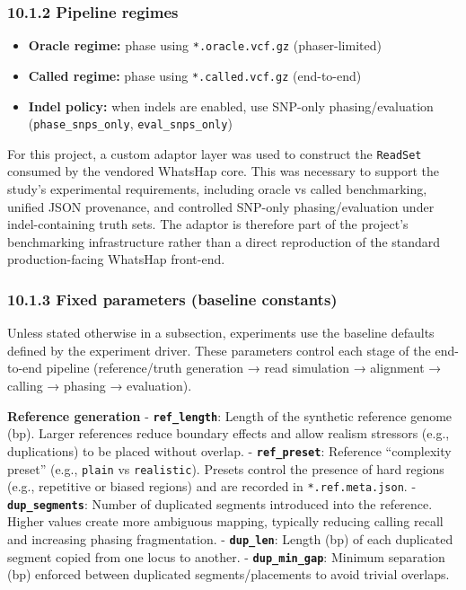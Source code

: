 \documentclass[
]{article}
\providecommand{\tightlist}{%
  \setlength{\itemsep}{0pt}\setlength{\parskip}{0pt}}
\begin{document}
\subsubsection{10.1.2 Pipeline regimes}\label{pipeline-regimes}

\begin{itemize}
\tightlist
\item
  \textbf{Oracle regime:} phase using \texttt{*.oracle.vcf.gz}
  (phaser-limited)
\item
  \textbf{Called regime:} phase using \texttt{*.called.vcf.gz}
  (end-to-end)
\item
  \textbf{Indel policy:} when indels are enabled, use SNP-only
  phasing/evaluation (\texttt{phase\_snps\_only},
  \texttt{eval\_snps\_only})
\end{itemize}

For this project, a custom adaptor layer was used to construct the
\texttt{ReadSet} consumed by the vendored WhatsHap core. This was
necessary to support the study's experimental requirements, including
oracle vs called benchmarking, unified JSON provenance, and controlled
SNP-only phasing/evaluation under indel-containing truth sets. The
adaptor is therefore part of the project's benchmarking infrastructure
rather than a direct reproduction of the standard production-facing
WhatsHap front-end.

\subsubsection{10.1.3 Fixed parameters (baseline
constants)}\label{fixed-parameters-baseline-constants}

Unless stated otherwise in a subsection, experiments use the baseline
defaults defined by the experiment driver. These parameters control each
stage of the end-to-end pipeline (reference/truth generation → read
simulation → alignment → calling → phasing → evaluation).

\textbf{Reference generation} - \textbf{\texttt{ref\_length}}: Length of
the synthetic reference genome (bp). Larger references reduce boundary
effects and allow realism stressors (e.g., duplications) to be placed
without overlap. - \textbf{\texttt{ref\_preset}}: Reference ``complexity
preset'' (e.g., \texttt{plain} vs \texttt{realistic}). Presets control
the presence of hard regions (e.g., repetitive or biased regions) and
are recorded in \texttt{*.ref.meta.json}. -
\textbf{\texttt{dup\_segments}}: Number of duplicated segments
introduced into the reference. Higher values create more ambiguous
mapping, typically reducing calling recall and increasing phasing
fragmentation. - \textbf{\texttt{dup\_len}}: Length (bp) of each
duplicated segment copied from one locus to another. -
\textbf{\texttt{dup\_min\_gap}}: Minimum separation (bp) enforced
between duplicated segments/placements to avoid trivial overlaps.
\end{document}
